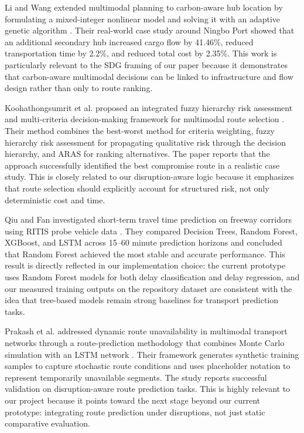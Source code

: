 Li and Wang extended multimodal planning to carbon-aware hub location by formulating a mixed-integer nonlinear model and solving it with an adaptive genetic algorithm \cite{liwang2023}. Their real-world case study around Ningbo Port showed that an additional secondary hub increased cargo flow by 41.46\%, reduced transportation time by 2.2\%, and reduced total cost by 2.35\%. This work is particularly relevant to the SDG framing of our paper because it demonstrates that carbon-aware multimodal decisions can be linked to infrastructure and flow design rather than only to route ranking.

Koohathongsumrit et al. proposed an integrated fuzzy hierarchy risk assessment and multi-criteria decision-making framework for multimodal route selection \cite{koohathongsumrit2024}. Their method combines the best-worst method for criteria weighting, fuzzy hierarchy risk assessment for propagating qualitative risk through the decision hierarchy, and ARAS for ranking alternatives. The paper reports that the approach successfully identified the best compromise route in a realistic case study. This is closely related to our disruption-aware logic because it emphasizes that route selection should explicitly account for structured risk, not only deterministic cost and time.

Qiu and Fan investigated short-term travel time prediction on freeway corridors using RITIS probe vehicle data \cite{qiu2021}. They compared Decision Trees, Random Forest, XGBoost, and LSTM across 15--60 minute prediction horizons and concluded that Random Forest achieved the most stable and accurate performance. This result is directly reflected in our implementation choice: the current prototype uses Random Forest models for both delay classification and delay regression, and our measured training outputs on the repository dataset are consistent with the idea that tree-based models remain strong baselines for transport prediction tasks.

Prakash et al. addressed dynamic route unavailability in multimodal transport networks through a route-prediction methodology that combines Monte Carlo simulation with an LSTM network \cite{prakash2024}. Their framework generates synthetic training samples to capture stochastic route conditions and uses placeholder notation to represent temporarily unavailable segments. The study reports successful validation on disruption-aware route prediction tasks. This is highly relevant to our project because it points toward the next stage beyond our current prototype: integrating route prediction under disruptions, not just static comparative evaluation.

